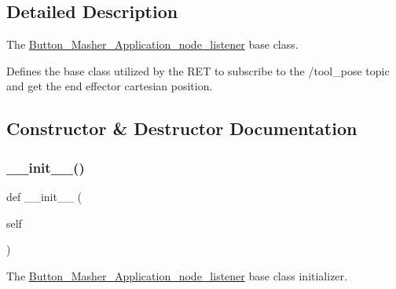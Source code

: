 \subsection{Detailed Description}
The \hyperlink{classButton__Masher__Application__Output_1_1Button__Masher__Application__node__listener}{Button\+\_\+\+Masher\+\_\+\+Application\+\_\+node\+\_\+listener} base class. 

Defines the base class utilized by the R\+ET to subscribe to the /tool\+\_\+pose topic and get the end effector cartesian position. 

\subsection{Constructor \& Destructor Documentation}
\mbox{\label{classButton__Masher__Application__Output_1_1Button__Masher__Application__node__listener_ae64f0875afe3067b97ba370b354b9213}} 
\subsubsection{\texorpdfstring{\+\_\+\+\_\+init\+\_\+\+\_\+()}{\_\_init\_\_()}}
{\footnotesize\ttfamily def \+\_\+\+\_\+init\+\_\+\+\_\+ (\begin{DoxyParamCaption}\item[{}]{self }\end{DoxyParamCaption})}



The \hyperlink{classButton__Masher__Application__Output_1_1Button__Masher__Application__node__listener}{Button\+\_\+\+Masher\+\_\+\+Application\+\_\+node\+\_\+listener} base class initializer. 



